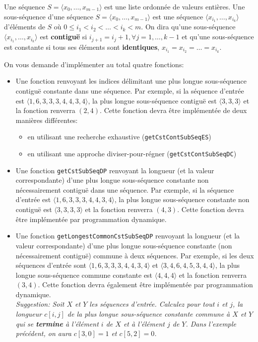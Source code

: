 \documentclass[a4paper,10pt]{article}
\begin{document}
Une séquence $S=\langle x_0,\ldots,x_{m-1}\rangle$ est une liste
ordonnée de valeurs entières. Une sous-séquence d'une séquence
$S=\langle x_0,\ldots,x_{m-1}\rangle$ est une séquence $\langle
x_{i_1},\ldots,x_{i_k}\rangle$ d'éléments de $S$ où $0\leq i_1<i_2<\ldots<i_k<m$. On
dira qu'une sous-séquence $\langle x_{i_1},\ldots,x_{i_k}\rangle$ est
{\bf contiguë} si $i_{j+1}=i_{j}+1, \forall j=1,\ldots,k-1$ et qu'une
sous-séquence est constante si tous ses éléments sont {\bf identiques},
$x_{i_1}=x_{i_2}=\ldots=x_{i_k}$.

On vous demande d'implémenter au total quatre fonctions:

\begin{itemize}
\item Une fonction renvoyant les indices délimitant une plus longue
  sous-séquence contiguë constante dans une séquence. Par exemple, si
  la séquence d'entrée est $\langle 1,6,3,3,3,4,4,3,4\rangle$, la plus
  longue sous-séquence contiguë est $\langle 3,3,3\rangle$ et la
  fonction renverra $(2,4)$. Cette fonction devra être implémentée de
  deux manières différentes:
\begin{itemize}
\item en utilisant une recherche exhaustive (\texttt{getCstContSubSeqES})
\item en utilisant une approche diviser-pour-régner (\texttt{getCstContSubSeqDC})
\end{itemize}

\item Une fonction \texttt{getCstSubSeqDP} renvoyant la longueur (et la valeur correspondante)
  d'une plus longue sous-séquence constante non nécessairement
  contiguë dans une séquence. Par exemple, si la séquence d'entrée est
  $\langle 1,6,3,3,3,4,4,3,4\rangle$, la plus longue sous-séquence
  constante non contiguë est $\langle 3,3,3,3\rangle$ et la fonction
  renverra $(4,3)$. Cette fonction devra être implémentée par
 programmation dynamique.

\item Une fonction \texttt{getLongestCommonCstSubSeqDP} renvoyant la longueur (et la valeur correspondante)
  d'une plus longue sous-séquence constante (non nécessairement
  contiguë) commune à deux séquences. Par exemple, si les deux
  séquences d'entrée sont $\langle 1,6,3,3,3,4,4,3,4\rangle$ et
  $\langle 3,4,6,4,5,3,4,4\rangle$, la plus longue sous-séquence
  commune constante est $\langle 4,4,4 \rangle$ et la fonction
  renverra $(3,4)$. Cette fonction devra également être implémentée
  par programmation dynamique.\\

{\it Suggestion: Soit $X$ et $Y$ les séquences d'entrée. Calculez pour
  tout $i$ et $j$, la longueur $c[i,j]$ de la plus longue
  sous-séquence constante commune à $X$ et $Y$ qui se {\bf termine} à
  l'élément $i$ de $X$ et à l'élément $j$ de $Y$. Dans l'exemple
  précédent, on aura $c[3,0]=1$ et $c[5,2]=0$.}
\end{itemize}
\end{document}

